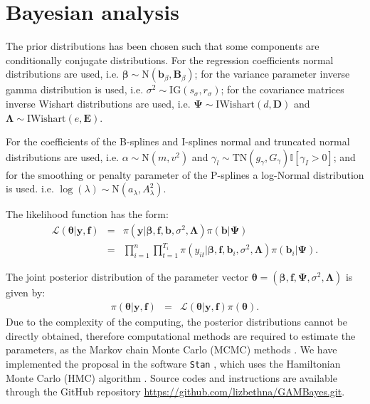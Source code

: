 \documentclass[11pt,letterpaper]{article}
\begin{document}
\section{Bayesian analysis}\label{sec:bayes}



The prior distributions has been chosen such that some components are conditionally conjugate distributions. 
For the regression coefficients normal distributions are used, i.e. 
$\boldsymbol{\beta} \sim \mathrm{N}\left(\mathbf{b}_{\beta},\mathbf{B}_{\beta}\right)$;  
for the variance parameter inverse gamma distribution is used, i.e. 
$\sigma^2 \sim  \mathrm{IG}\left(s_{\sigma},r_{\sigma}\right)$; 
for the covariance matrices inverse Wishart distributions are used, i.e. 
$\boldsymbol{\Psi} \sim \mathrm{IWishart}(d,\boldsymbol{D})$ and 
$\boldsymbol{\Lambda} \sim \mathrm{IWishart}(e,\boldsymbol{E})$.  

For the coefficients of the B-splines and I-splines normal and truncated normal distributions are used, i.e. 
$\alpha \sim \mathrm{N}\left(m,v^2\right)$ and 
$\gamma_{l} \sim  \mathrm{TN}\left(g_{\gamma},G_{\gamma}\right)\mathbb{I}[\gamma_I>0] $; and 
for the smoothing or penalty parameter of the P-splines a log-Normal distribution is used. i.e. $\log(\lambda)\sim\mathrm{N}(a_{\lambda},A_{\lambda}^2)$. 


The likelihood function has the form: 
\begin{eqnarray*}
 \mathcal{L}\left( \boldsymbol{\theta} | \boldsymbol{y},\boldsymbol{f} \right)  
 &=&  
\pi \left(\boldsymbol{y}| \boldsymbol{\beta}, \boldsymbol{f},  \boldsymbol{b}, \sigma^2,\boldsymbol{\Lambda} \right)
\pi(\boldsymbol{b} | \boldsymbol{\Psi}) \\
&=&  
\prod_{i=1}^{n} \prod_{t=1}^{T_i} 
\pi \left(y_{it}| \boldsymbol{\beta}, \boldsymbol{f},  \boldsymbol{b}_i, \sigma^2,\boldsymbol{\Lambda} \right)
\pi(\boldsymbol{b}_i | \boldsymbol{\Psi}) .
\end{eqnarray*} 

The joint posterior distribution of the parameter vector $\boldsymbol{\theta}=( \boldsymbol{\beta}, \boldsymbol{f},  \boldsymbol{\Psi}, \sigma^2,\boldsymbol{\Lambda} )$ is given by: 
\begin{eqnarray*}
\pi(\boldsymbol{\theta}|\boldsymbol{y},\boldsymbol{f})  &=&  \mathcal{L}(\boldsymbol{\theta}|\boldsymbol{y},\boldsymbol{f}) \pi (\boldsymbol{\theta}) .
\end{eqnarray*} 
Due to the complexity of the computing, the posterior distributions cannot be directly obtained, therefore computational methods are required to estimate the parameters, as the Markov chain Monte Carlo (MCMC) methods \citep{CheShaIbr00,GamLop06}. 
We have implemented the proposal in the software \texttt{Stan}  \citep{stan23, rstan20}, which uses the Hamiltonian  Monte Carlo (HMC) algorithm \citep{Bet18}.  
Source codes and instructions are available through the GitHub repository \url{https://github.com/lizbethna/GAMBayes.git}.
\end{document}
